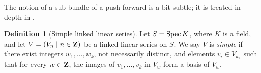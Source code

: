 \documentclass[11pt,reqno]{amsart}
\theoremstyle{plain}
\theoremstyle{definition}
\newtheorem{definition}[theorem]{Definition}
\theoremstyle{remark}
\numberwithin{equation}{section}
\renewcommand{\to}{{\longrightarrow}}
\numberwithin{equation}{section}
\begin{document}
\begin{remark}
The notion of a sub-bundle of a push-forward is a bit subtle; it is treated in depth in \cite[Definition~B.2.1]{oss:14}.
\end{remark}



\begin{definition}[Simple linked linear series]
  \label{def:simple_lls}
Let $S = \operatorname{Spec} K$, where $K$ is a field, and let $V = (V_n \mid n \in {\bf Z})$ be a linked linear series on $S$.
We say  $V$ is \emph{simple} if there exist integers $w_1, \dots, w_k$, not necessarily distinct, and elements $v_i \in V_{w_i}$ such that for every $w \in {\bf Z}$, the images of $v_1, \dots, v_k$ in $V_w$ form a basis of $V_w$.
\end{definition}
\end{document}
